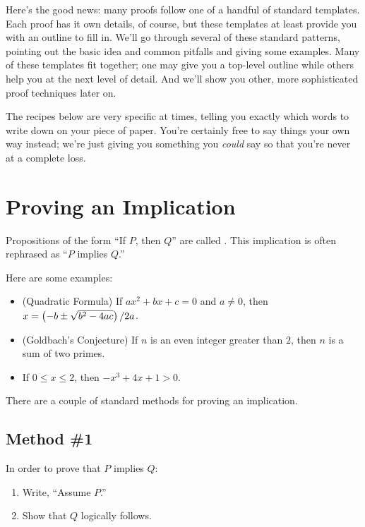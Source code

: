 Here's the good news: many proofs follow one of a handful of standard
templates.  Each proof has it own details, of course, but these
templates at least provide you with an outline to fill in.  We'll go
through several of these standard patterns, pointing out the basic
idea and common pitfalls and giving some examples.  Many of these
templates fit together; one may give you a top-level outline while
others help you at the next level of detail.  And we'll show you
other, more sophisticated proof techniques later on.

The recipes below are very specific at times, telling you exactly
which words to write down on your piece of paper.  You're certainly
free to say things your own way instead; we're just giving you
something you \textit{could} say so that you're never at a complete
loss.


\section{Proving an Implication}
\label{sec:prove_implies}

Propositions of the form ``If $P$, then $Q$'' are called
.  This implication is often rephrased as ``$P$ implies
$Q$.''

Here are some examples:
%
\begin{itemize}

\item (Quadratic Formula) If $a x^2 + b x + c = 0$ and $a \neq 0$,
then $x = \left(- b \pm \sqrt{b^2 - 4 a c}\right) / 2a$.

\item (Goldbach's Conjecture) If $n$ is an even integer greater than
$2$, then $n$ is a sum of two primes.

\item If $0 \leq x \leq 2$, then $-x^3 + 4x + 1 > 0$.

\end{itemize}
%
There are a couple of standard methods for proving an implication.

\subsection{Method \#1}

In order to prove that $P$ implies $Q$:
%
\begin{enumerate}
\item Write, ``Assume $P$.''
\item Show that $Q$ logically follows.
\end{enumerate}

